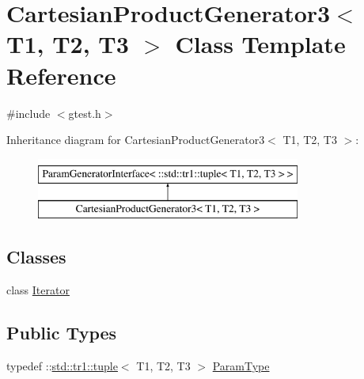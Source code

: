 \hypertarget{classtesting_1_1internal_1_1CartesianProductGenerator3}{\section{\-Cartesian\-Product\-Generator3$<$ \-T1, \-T2, \-T3 $>$ \-Class \-Template \-Reference}
\label{d1/d15/classtesting_1_1internal_1_1CartesianProductGenerator3}
}


{\ttfamily \#include $<$gtest.\-h$>$}

\-Inheritance diagram for \-Cartesian\-Product\-Generator3$<$ \-T1, \-T2, \-T3 $>$\-:\begin{figure}[H]
\begin{center}
\leavevmode
\includegraphics[height=2.000000cm]{d1/d15/classtesting_1_1internal_1_1CartesianProductGenerator3}
\end{center}
\end{figure}
\subsection*{\-Classes}
\begin{DoxyCompactItemize}
\item 
class \hyperlink{classtesting_1_1internal_1_1CartesianProductGenerator3_1_1Iterator}{\-Iterator}
\end{DoxyCompactItemize}
\subsection*{\-Public \-Types}
\begin{DoxyCompactItemize}
\item 
typedef \-::\hyperlink{classstd_1_1tr1_1_1tuple}{std\-::tr1\-::tuple}$<$ \-T1, \*
\-T2, \-T3 $>$ \hyperlink{classtesting_1_1internal_1_1CartesianProductGenerator3_a61f35be35e7acfed27d8b46ee9713bb3}{\-Param\-Type}
\end{DoxyCompactItemize}
